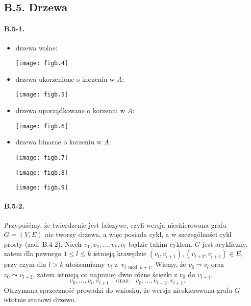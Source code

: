 \subsection*{B.5. Drzewa}

\paragraph{B.5-1.}
\begin{itemize}
  \item drzewa wolne:
  \begin{center}
	\texttt{[image: figb.4]}
  \end{center}
  \item drzewa ukorzenione o korzeniu w $A$:
  \begin{center}
	\texttt{[image: figb.5]}
  \end{center}
  \item drzewa uporządkowane o korzeniu w $A$:
  \begin{center}
	\texttt{[image: figb.6]}
  \end{center}
  \item drzewa binarne o korzeniu w $A$:
  \begin{center}
	\texttt{[image: figb.7]} \\
  \end{center}
  \begin{center}
	\texttt{[image: figb.8]} \\
  \end{center}
  \begin{center}
	\texttt{[image: figb.9]} \\
  \end{center}
\end{itemize}

\paragraph{B.5-2.}
Przypuśćmy, że twierdzenie jest fałszywe, czyli wersja nieskierowana grafu $G=(V,E)$ nie tworzy drzewa, a więc posiada cykl, a w szczególności cykl prosty (zad. B.4-2). Niech $v_1,v_2,\dots,v_k,v_1$ będzie takim cyklem. $G$ jest acykliczny, zatem dla pewnego $1\le l\le k$ istnieją krawędzie $(v_l,v_{l+1}),(v_{l+2},v_{l+1})\in E$, przy czym dla $l>k$ utożsamiamy $v_l$ z~$v_{l\bmod k+1}$. Wiemy, że $v_0\leadsto v_l$ oraz $v_0\leadsto v_{l+2}$, zatem istnieją co najmniej dwie różne ścieżki z $v_0$ do $v_{l+1}$,
\[
	v_0,\dots,v_l,v_{l+1}\quad\mbox{oraz}\quad v_0,\dots,v_{l+2},v_{l+1}.
\]
Otrzymana sprzeczność prowadzi do wniosku, że wersja nieskierowana grafu $G$ istotnie stanowi drzewo.

